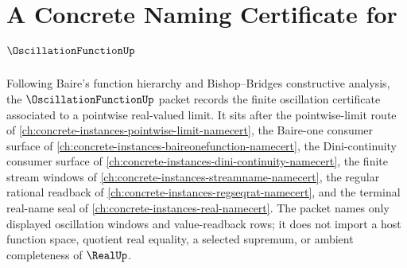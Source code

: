 \chapter{A Concrete Naming Certificate for $\OscillationFunctionUp$}
\label{ch:concrete-instances-oscillation-function-namecert}

Following Baire's function hierarchy and Bishop--Bridges constructive analysis, the $\OscillationFunctionUp$ packet records the finite oscillation certificate associated to a pointwise real-valued limit. It sits after the pointwise-limit route of \autoref{ch:concrete-instances-pointwise-limit-namecert}, the Baire-one consumer surface of \autoref{ch:concrete-instances-baireonefunction-namecert}, the Dini-continuity consumer surface of \autoref{ch:concrete-instances-dini-continuity-namecert}, the finite stream windows of \autoref{ch:concrete-instances-streamname-namecert}, the regular rational readback of \autoref{ch:concrete-instances-regseqrat-namecert}, and the terminal real-name seal of \autoref{ch:concrete-instances-real-namecert}. The packet names only displayed oscillation windows and value-readback rows; it does not import a host function space, quotient real equality, a selected supremum, or ambient completeness of $\RealUp$.

